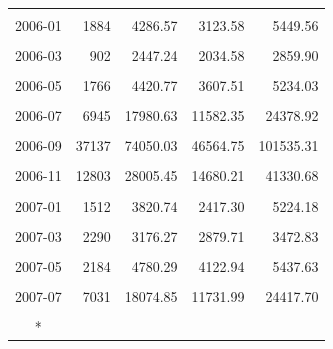 \begin{longtable}[t]{crrrr}
\cellcolor{gray!10}{2005-12} & \cellcolor{gray!10}{5046} & \cellcolor{gray!10}{12529.30} & \cellcolor{gray!10}{6704.08} & \cellcolor{gray!10}{18354.51}\\
2006-01 & 1884 & 4286.57 & 3123.58 & 5449.56\\
\cellcolor{gray!10}{2006-02} & \cellcolor{gray!10}{1348} & \cellcolor{gray!10}{2534.10} & \cellcolor{gray!10}{1904.61} & \cellcolor{gray!10}{3163.60}\\
2006-03 & 902 & 2447.24 & 2034.58 & 2859.90\\
\cellcolor{gray!10}{2006-04} & \cellcolor{gray!10}{841} & \cellcolor{gray!10}{2462.00} & \cellcolor{gray!10}{2081.60} & \cellcolor{gray!10}{2842.39}\\
2006-05 & 1766 & 4420.77 & 3607.51 & 5234.03\\
\cellcolor{gray!10}{2006-06} & \cellcolor{gray!10}{3137} & \cellcolor{gray!10}{8363.93} & \cellcolor{gray!10}{4084.87} & \cellcolor{gray!10}{12643.00}\\
2006-07 & 6945 & 17980.63 & 11582.35 & 24378.92\\
\cellcolor{gray!10}{2006-08} & \cellcolor{gray!10}{25670} & \cellcolor{gray!10}{71474.65} & \cellcolor{gray!10}{48886.73} & \cellcolor{gray!10}{94062.57}\\
2006-09 & 37137 & 74050.03 & 46564.75 & 101535.31\\
\cellcolor{gray!10}{2006-10} & \cellcolor{gray!10}{16831} & \cellcolor{gray!10}{32013.40} & \cellcolor{gray!10}{27275.07} & \cellcolor{gray!10}{36751.74}\\
2006-11 & 12803 & 28005.45 & 14680.21 & 41330.68\\
\cellcolor{gray!10}{2006-12} & \cellcolor{gray!10}{8023} & \cellcolor{gray!10}{15854.26} & \cellcolor{gray!10}{11636.28} & \cellcolor{gray!10}{20072.24}\\
2007-01 & 1512 & 3820.74 & 2417.30 & 5224.18\\
\cellcolor{gray!10}{2007-02} & \cellcolor{gray!10}{1179} & \cellcolor{gray!10}{2436.94} & \cellcolor{gray!10}{1704.04} & \cellcolor{gray!10}{3169.85}\\
2007-03 & 2290 & 3176.27 & 2879.71 & 3472.83\\
\cellcolor{gray!10}{2007-04} & \cellcolor{gray!10}{850} & \cellcolor{gray!10}{2472.09} & \cellcolor{gray!10}{2096.00} & \cellcolor{gray!10}{2848.18}\\
2007-05 & 2184 & 4780.29 & 4122.94 & 5437.63\\
\cellcolor{gray!10}{2007-06} & \cellcolor{gray!10}{4889} & \cellcolor{gray!10}{10114.30} & \cellcolor{gray!10}{6648.18} & \cellcolor{gray!10}{13580.43}\\
2007-07 & 7031 & 18074.85 & 11731.99 & 24417.70\\
\cellcolor{gray!10}{2007-08} & \cellcolor{gray!10}{6299} & \cellcolor{gray!10}{70987.79} & \cellcolor{gray!10}{30021.51} & \cellcolor{gray!10}{111954.07}\\*
\end{longtable}
